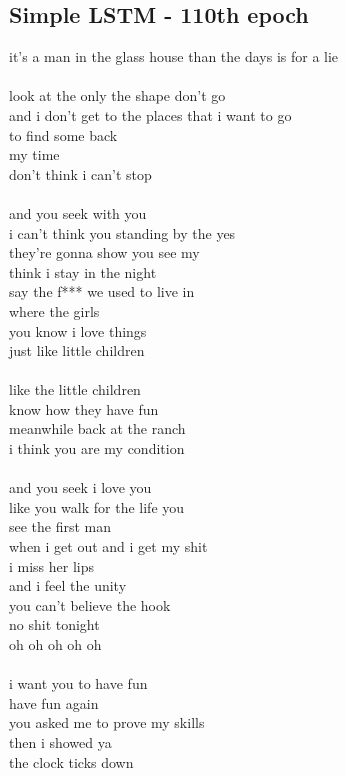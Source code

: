 \documentclass[conference]{IEEEtran}
\begin{document}
\subsection{Simple LSTM - 110th epoch}\label{LSTM110}
it's a man in the glass house than the days is for a lie \\
 \\
look at the only the shape don't go \\
and i don't get to the places that i want to go \\
to find some back \\
my time \\
don't think i can't stop \\
 \\
and you seek with you \\
i can't think you standing by the yes \\
they're gonna show you see my \\
think i stay in the night \\
say the f*** we used to live in \\
where the girls \\
you know i love things \\
just like little children \\
 \\
like the little children \\
know how they have fun \\
meanwhile back at the ranch \\
i think you are my condition \\
 \\
and you seek i love you \\
like you walk for the life you \\
see the first man \\
when i get out and i get my shit \\
i miss her lips \\
and i feel the unity \\
you can't believe the hook \\
no shit tonight \\
oh oh oh oh oh \\
 \\
i want you to have fun \\
have fun again \\
you asked me to prove my skills \\
then i showed ya \\
the clock ticks down \\
\end{document}
